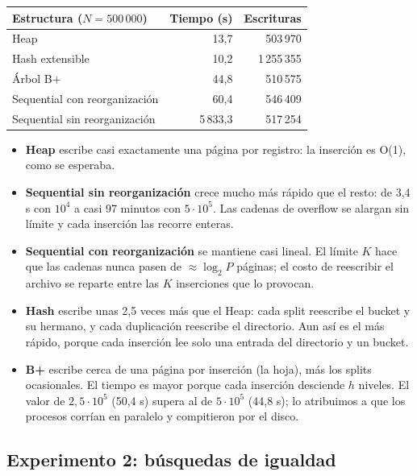 \documentclass[11pt,a4paper]{article}
\begin{document}
\begin{center}
\begin{tabular}{lrr}
\toprule
Estructura ($N = 500\,000$) & Tiempo (s) & Escrituras \\
\midrule
Heap & 13,7 & 503\,970 \\
Hash extensible & 10,2 & 1\,255\,355 \\
Árbol B+ & 44,8 & 510\,575 \\
Sequential con reorganización & 60,4 & 546\,409 \\
Sequential sin reorganización & 5\,833,3 & 517\,254 \\
\bottomrule
\end{tabular}
\end{center}

\begin{itemize}
  \item \textbf{Heap} escribe casi exactamente una página por registro: la inserción
        es O(1), como se esperaba.
  \item \textbf{Sequential sin reorganización} crece mucho más rápido que el resto:
        de 3,4 s con $10^4$ a casi 97 minutos con $5\cdot10^5$. Las cadenas de overflow
        se alargan sin límite y cada inserción las recorre enteras.
  \item \textbf{Sequential con reorganización} se mantiene casi lineal. El límite $K$
        hace que las cadenas nunca pasen de $\approx \log_2 P$ páginas; el costo de
        reescribir el archivo se reparte entre las $K$ inserciones que lo provocan.
  \item \textbf{Hash} escribe unas 2,5 veces más que el Heap: cada split reescribe el
        bucket y su hermano, y cada duplicación reescribe el directorio. Aun así es el
        más rápido, porque cada inserción lee solo una entrada del directorio y un
        bucket.
  \item \textbf{B+} escribe cerca de una página por inserción (la hoja), más los
        splits ocasionales. El tiempo es mayor porque cada inserción desciende $h$
        niveles. El valor de $2{,}5\cdot10^5$ (50,4 s) supera al de $5\cdot10^5$
        (44,8 s); lo atribuimos a que los procesos corrían en paralelo y compitieron
        por el disco.
\end{itemize}

\subsection{Experimento 2: búsquedas de igualdad}
\end{document}
